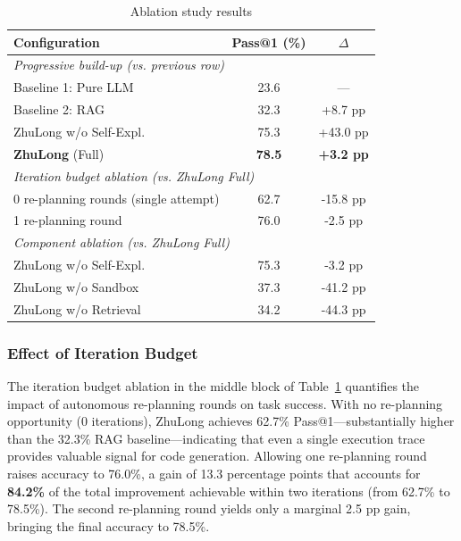 \documentclass[anonymous, sigconf]{acmart}
\begin{document}
\begin{table}[htbp]
\centering
\caption{Ablation study results}
\label{tab:main-ablation}
\begin{tabular}{lcc}
\toprule
\textbf{Configuration} & \textbf{Pass@1 (\%)} & \textbf{$\Delta$} \\
\midrule
\multicolumn{3}{l}{\textit{Progressive build-up (vs. previous row)}} \\
Baseline 1: Pure LLM & 23.6 & — \\
Baseline 2: RAG & 32.3 & +8.7 pp \\
ZhuLong w/o Self-Expl. & 75.3 & +43.0 pp \\
\textbf{ZhuLong} (Full) & \textbf{78.5} & \textbf{+3.2 pp} \\
\midrule
\multicolumn{3}{l}{\textit{Iteration budget ablation (vs. ZhuLong Full)}} \\
0 re-planning rounds (single attempt) & 62.7 & -15.8 pp \\
1 re-planning round & 76.0 & -2.5 pp \\
\midrule
\multicolumn{3}{l}{\textit{Component ablation (vs. ZhuLong Full)}} \\
ZhuLong w/o Self-Expl. & 75.3 & -3.2 pp \\
ZhuLong w/o Sandbox & 37.3 & -41.2 pp \\
ZhuLong w/o Retrieval & 34.2 & -44.3 pp \\
\bottomrule
\end{tabular}
\end{table}

\subsubsection{Effect of Iteration Budget}
\label{sec:iteration-budget-effect}

The iteration budget ablation in the middle block of 
Table~\ref{tab:main-ablation} quantifies the impact of autonomous 
re-planning rounds on task success. With no re-planning opportunity (0 
iterations), ZhuLong achieves 62.7\% Pass@1—substantially higher than the 
32.3\% RAG baseline—indicating that even a single execution trace provides 
valuable signal for code generation. Allowing one re-planning round raises 
accuracy to 76.0\%, a gain of 13.3 percentage points that accounts for 
\textbf{84.2\%} of the total improvement achievable within two iterations 
(from 62.7\% to 78.5\%). The second re-planning round yields only a 
marginal 2.5 pp gain, bringing the final accuracy to 78.5\%.
\end{document}
